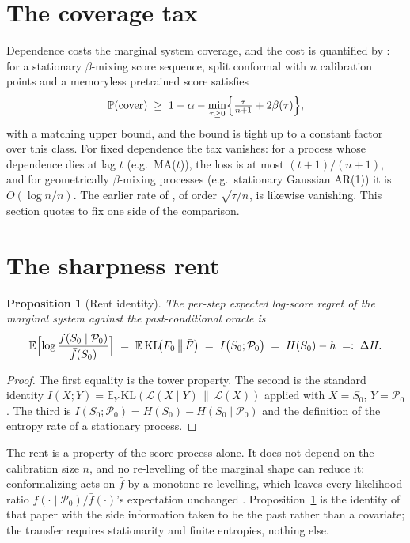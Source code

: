 \documentclass[11pt]{article}
\newtheorem{proposition}{Proposition}
\theoremstyle{remark}
\newcommand{\E}{\mathbb{E}}
\newcommand{\Prob}{\mathbb{P}}
\begin{document}
\section{The coverage tax}\label{sec:tax}

Dependence costs the marginal system coverage, and the cost is quantified by
\citet{barberpananjady2026}: for a stationary $\beta$-mixing score sequence, split conformal with
$n$ calibration points and a memoryless pretrained score satisfies
\begin{equation}\label{eq:tax}
\Prob(\text{cover})\;\ge\;1-\alpha-\min_{\tau\ge 0}
\Bigl\{\tfrac{\tau}{n+1}+2\beta(\tau)\Bigr\},
\end{equation}
with a matching upper bound, and the bound is tight up to a constant factor over this class. For
fixed dependence the tax vanishes: for a process whose dependence dies at lag $t$
(e.g.\ MA($t$)), the loss is at most $(t+1)/(n+1)$, and for geometrically $\beta$-mixing
processes (e.g.\ stationary Gaussian AR(1)) it is $O(\log n/n)$. The earlier rate of
\citet{oliveira2024}, of order $\sqrt{\tau/n}$, is likewise vanishing. This section quotes \citet{barberpananjady2026} to fix one side of the comparison.

\section{The sharpness rent}\label{sec:rent}

\begin{proposition}[Rent identity]\label{prop:rent}
The per-step expected log-score regret of the marginal system against the past-conditional
oracle is
\[
\E\Bigl[\log\frac{f(S_0\mid\mathcal P_0)}{\bar f(S_0)}\Bigr]
\;=\;\E\,\mathrm{KL}\!\bigl(F_0\,\big\|\,\bar F\bigr)
\;=\;I\bigl(S_0;\mathcal P_0\bigr)
\;=\;H(S_0)-h\;=:\;\Delta H .
\]
\end{proposition}

\begin{proof}
The first equality is the tower property. The second is the standard identity
$I(X;Y)=\E_Y\,\mathrm{KL}(\mathcal L(X\mid Y)\,\|\,\mathcal L(X))$ applied with $X=S_0$,
$Y=\mathcal P_0$. The third is $I(S_0;\mathcal P_0)=H(S_0)-H(S_0\mid\mathcal P_0)$ and the
definition of the entropy rate of a stationary process.
\end{proof}

The rent is a property of the score process alone. It does not depend on the calibration size
$n$, and no re-levelling of the marginal shape can reduce it: conformalizing acts on $\bar f$ by
a monotone re-levelling, which leaves every likelihood ratio $f(\cdot\mid\mathcal P_0)/\bar
f(\cdot)$'s expectation unchanged \citep{cotton_marginally}. Proposition~\ref{prop:rent} is the
identity of that paper with the side information taken to be the past rather than a covariate;
the transfer requires stationarity and finite entropies, nothing else.
\end{document}
